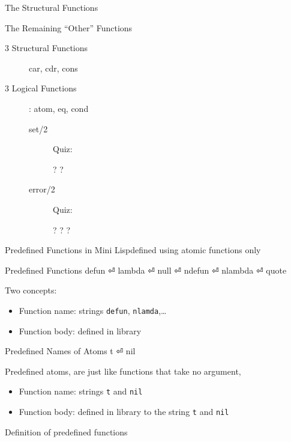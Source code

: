 \documentclass[fleqn]{beamer}
\begin{document}
\begin{frame}{The Structural Functions}
\begin{frame}{The Remaining ``Other'' Functions}
\begin{description}
  \item[3 Structural Functions] car, cdr, cons
  \item[3 Logical Functions]: atom, eq, cond
    \begin{description}
      \item[set/2] Quiz:
        \begin{itemize}
          ?
          ?
        \end{itemize}
      \item[error/2] Quiz:
        \begin{itemize}
          ?
          ?
          ?
        \end{itemize}
    \end{description}
\end{description}
\end{frame}

\begin{frame}{Predefined Functions in Mini Lisp}{defined using atomic functions only}
\begin{block}{Predefined Functions}
  defun ⏎
  lambda ⏎
  null ⏎
  ndefun ⏎
  nlambda ⏎
  quote
\end{block}
Two concepts:
\begin{itemize}
  \item Function name: strings \texttt{defun}, \texttt{nlamda},…
  \item Function body: defined in library
\end{itemize}
\pause
\begin{block}{Predefined Names of Atoms}
  t ⏎
  nil
\end{block}
Predefined atoms, are just like functions that take no argument,
\begin{itemize}
  \item Function name: strings \texttt{t} and \texttt{nil}
  \item Function body: defined in library to the string \texttt{t} and \texttt{nil}
\end{itemize}
\end{frame}

\begin{frame}{Definition of predefined functions}
\begin{LTR}
  
\end{LTR}
\end{frame}


\end{frame}
\end{document}
